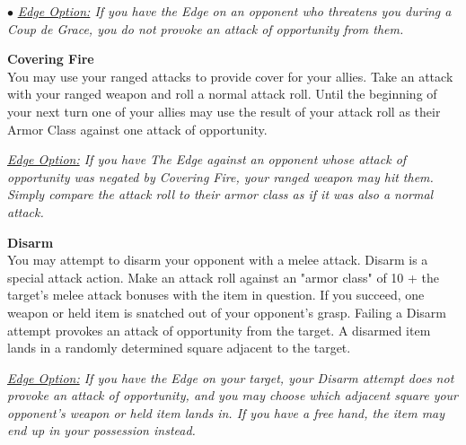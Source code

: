 \begin{list}{$\bullet$}{\itemspace}
\smallskip\emph{\underline{Edge Option:} If you have the Edge on an opponent who threatens you during a Coup de Grace, you do not provoke an attack of opportunity from them.}\\

\hypertarget{combat:coveringfire}{}
\normalsize\item\textbf{{Covering Fire}}\\\small
You may use your ranged attacks to provide cover for your allies. Take an attack with your ranged weapon and roll a normal attack roll. Until the beginning of your next turn one of your allies may use the result of your attack roll as their Armor Class against one attack of opportunity.

\smallskip\emph{\underline{Edge Option:} If you have The Edge against an opponent whose attack of opportunity was negated by Covering Fire, your ranged weapon may hit them. Simply compare the attack roll to their armor class as if it was also a normal attack.}\\

\hypertarget{combat:disarm}{}
\normalsize\item\textbf{{Disarm}}\\\small
You may attempt to disarm your opponent with a melee attack. Disarm is a special attack action. Make an attack roll against an "armor class" of 10 + the target's melee attack bonuses with the item in question. If you succeed, one weapon or held item is snatched out of your opponent's grasp. Failing a Disarm attempt provokes an attack of opportunity from the target. A disarmed item lands in a randomly determined square adjacent to the target.



\smallskip\emph{\underline{Edge Option:} If you have the Edge on your target, your Disarm attempt does not provoke an attack of opportunity, and you may choose which adjacent square your opponent's weapon or held item lands in. If you have a free hand, the item may end up in your possession instead.}\\


\end{list}
